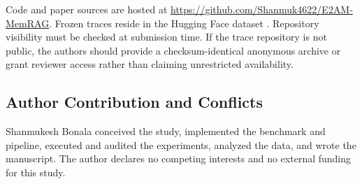 Code and paper sources are hosted at
\url{https://github.com/Shanmuk4622/E2AM-MemRAG}. Frozen traces reside in the
Hugging Face dataset . Repository visibility
must be checked at submission time. If the trace repository is not public, the
authors should provide a checksum-identical anonymous archive or grant reviewer
access rather than claiming unrestricted availability.



\subsection{Author Contribution and Conflicts}

Shanmukesh Bonala conceived the study, implemented the benchmark and pipeline,
executed and audited the experiments, analyzed the data, and wrote the manuscript.
The author declares no competing interests and no external funding for this study.
